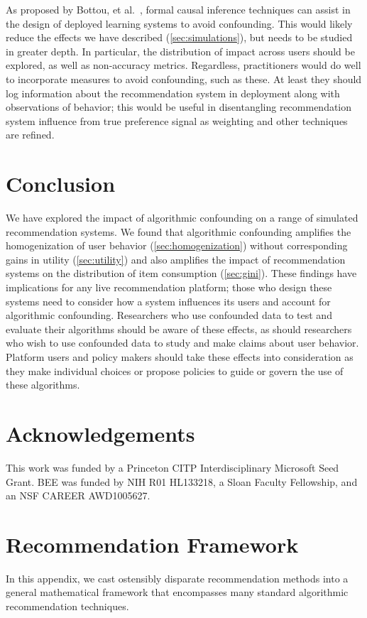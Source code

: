 \documentclass[sigconf]{acmart}
\begin{document}
As proposed by Bottou, et al.~\cite{bottou2013counterfactual}, formal causal inference techniques can assist in the design of deployed learning systems to avoid confounding.  This would likely reduce the effects we have described (\cref{sec:simulations}), but needs to be studied in greater depth.  In particular, the distribution of impact across users should be explored, as well as non-accuracy metrics. Regardless, practitioners would do well to incorporate measures to avoid confounding, such as these.  At least they should log information about the recommendation system in deployment along with observations of behavior; this would be useful in disentangling recommendation system influence from true preference signal as weighting and other techniques are refined.

\section{Conclusion}
\label{sec:conclusion}
We have explored the impact of algorithmic confounding on a range of simulated recommendation systems. We found that algorithmic confounding amplifies the homogenization of user behavior (\cref{sec:homogenization}) without corresponding gains in utility (\cref{sec:utility}) and also amplifies the impact of recommendation systems on the distribution of item consumption (\cref{sec:gini}).
These findings have implications for any live recommendation platform; those who design these systems need to consider how a system influences its users and account for algorithmic confounding. Researchers who use confounded data to test and evaluate their algorithms should be aware of these effects, as should researchers who wish to use confounded data to study and make claims about user behavior.  Platform users and policy makers should take these effects into consideration as they make individual choices or propose policies to guide or govern the use of these algorithms.

\section*{Acknowledgements} This work was funded by a Princeton CITP Interdisciplinary Microsoft Seed Grant. BEE was funded by NIH R01 HL133218, a Sloan Faculty Fellowship, and an NSF CAREER AWD1005627.

\appendix
\section{Recommendation Framework}
\label{sec:framework}
In this appendix, we cast ostensibly disparate recommendation methods into a general mathematical framework that encompasses many standard algorithmic recommendation techniques.
\end{document}
